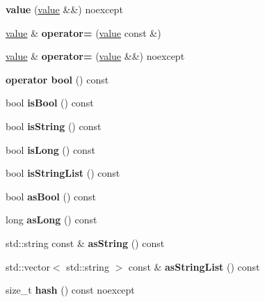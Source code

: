 \begin{DoxyCompactItemize}
{\bfseries value} (\hyperlink{structdocopt_1_1value}{value} \&\&) noexcept
\item 
\mbox{\label{structdocopt_1_1value_a7d4caf9cee73181e601c552d91c67c83}} 
\hyperlink{structdocopt_1_1value}{value} \& {\bfseries operator=} (\hyperlink{structdocopt_1_1value}{value} const \&)
\item 
\mbox{\label{structdocopt_1_1value_ad631e7d4d8abdf0263f03c5915a1e7f9}} 
\hyperlink{structdocopt_1_1value}{value} \& {\bfseries operator=} (\hyperlink{structdocopt_1_1value}{value} \&\&) noexcept
\item 
\mbox{\label{structdocopt_1_1value_a781bbacfa45b53aa77159b00cbb344d8}} 
{\bfseries operator bool} () const
\item 
\mbox{\label{structdocopt_1_1value_ad426d707f8e8297151f01813827bc3ec}} 
bool {\bfseries is\+Bool} () const
\item 
\mbox{\label{structdocopt_1_1value_a18f3e2db1103c9a115e7c5155155b58c}} 
bool {\bfseries is\+String} () const
\item 
\mbox{\label{structdocopt_1_1value_af6b108aae989371310be8dcf1b84837a}} 
bool {\bfseries is\+Long} () const
\item 
\mbox{\label{structdocopt_1_1value_af9eaafab4c25c572d14140e4fb0c38e2}} 
bool {\bfseries is\+String\+List} () const
\item 
\mbox{\label{structdocopt_1_1value_a0f73668a1c8451d7e3471b1aebd4fa3d}} 
bool {\bfseries as\+Bool} () const
\item 
\mbox{\label{structdocopt_1_1value_a4b3bf11b1f06c643f62a7ce842d49282}} 
long {\bfseries as\+Long} () const
\item 
\mbox{\label{structdocopt_1_1value_a69aa7f940b1e8b3e5f8e283e80412475}} 
std\+::string const  \& {\bfseries as\+String} () const
\item 
\mbox{\label{structdocopt_1_1value_af3f860f403f5c6d61eda6f7296a378c5}} 
std\+::vector$<$ std\+::string $>$ const  \& {\bfseries as\+String\+List} () const
\item 
\mbox{\label{structdocopt_1_1value_adf5870e74191ec2202bd26193147be79}} 
size\+\_\+t {\bfseries hash} () const noexcept
\end{DoxyCompactItemize}
